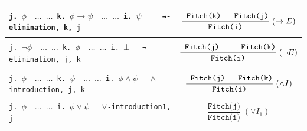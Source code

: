 \documentclass[shortabstract]{iithesis}
\theoremstyle{definition}
\theoremstyle{remark}
\theoremstyle{plain}
\begin{document}
\begin{center}
\begin{longtable}{|p{}|p{}|}
\hline

\texttt{j. $\phi \quad  \dots$
     \newline
     $\dots$
     \newline
     k.  $\phi \to \psi \quad  \dots$
     \newline
     $\dots$
     \newline
     i. $\psi \qquad$ →-elimination, k, j
     }





&
$$\displaystyle
\frac{\texttt{ Fitch(k) \quad Fitch(j)}}{\texttt{Fitch(i)}}\;(\to E)
$$
\\

\hline

\texttt{j. $ \neg \phi \quad  \dots$
     \newline
     $\dots$
     \newline
     k.  $\phi  \quad  \dots$
     \newline
     $\dots$
     \newline
     i. $\bot \quad$ ¬-elimination, j, k
     }





&
$$\displaystyle
\frac{\texttt{ Fitch(j) \qquad Fitch(k)}}{\texttt{Fitch(i)}}\;(\neg E)
$$
\\

\hline





\texttt{j. $  \phi \quad  \dots$
     \newline
     $\dots$
     \newline
     k.  $\psi  \quad  \dots$
     \newline
     $\dots$
     \newline
     i. $\phi \land \psi \quad$ $\wedge$-introduction, j, k}





&
$$\displaystyle
\frac{\texttt{ Fitch(j) \quad Fitch(k)}}{\texttt{Fitch(i)}}\;(\wedge I)
$$






\\

\hline



\texttt{j. $  \phi \quad  \dots$
     \newline
     $\dots$
     \newline
     i. $\phi \lor \psi \quad$ $\lor$-introduction1, j}
&
$$\displaystyle
\frac{\texttt{Fitch(j)}}{\texttt{Fitch(i)}}\;(\lor I_1)
$$
\\


\end{longtable}
\end{center}
\end{document}

